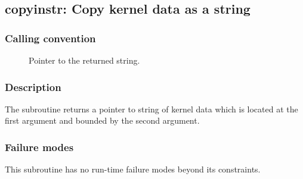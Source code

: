 \clearpage
{}
{}
\label{subr:copyinstr}
\subsection*{copyinstr: Copy kernel data as a string}

\subsubsection*{Calling convention}

\begin{description}
\item[] Pointer to the returned string.
\end{description}

\subsubsection*{Description}

The  subroutine returns a pointer to string of
kernel data which is located at the first argument and bounded by the
second argument.

\subsubsection*{Failure modes}

This subroutine has no run-time failure modes beyond its constraints.
